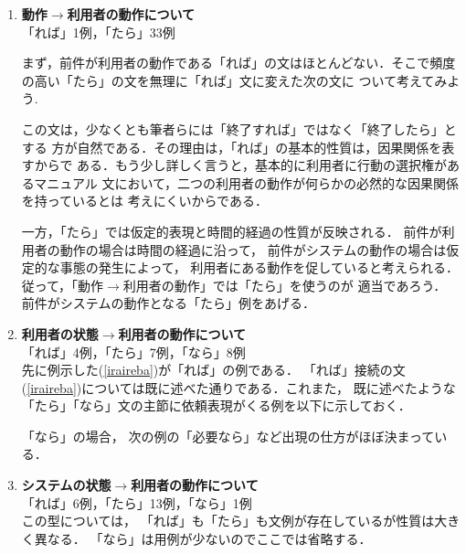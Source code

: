 \begin{enumerate}
\item {\bf 動作$\rightarrow$利用者の動作について}\label{act-usract} \\
「れば」1例，「たら」33例

まず，前件が利用者の動作である「れば」の文はほとんどない．そこで頻度の高い「たら」の文を無理に「れば」文に変えた次の文に
ついて考えてみよう.

この文は，少なくとも筆者らには「終了すれば」ではなく「終了したら」とする
方が自然である．その理由は，「れば」の基本的性質は，因果関係を表すからで
ある．もう少し詳しく言うと，基本的に利用者に行動の選択権があるマニュアル
文において，二つの利用者の動作が何らかの必然的な因果関係を持っているとは
考えにくいからである．

一方，「たら」では仮定的表現と時間的経過の性質が反映される．
前件が利用者の動作の場合は時間の経過に沿って，
前件がシステムの動作の場合は仮定的な事態の発生によって，
利用者にある動作を促していると考えられる．
従って，「動作$\rightarrow$利用者の動作」では「たら」を使うのが
適当であろう．
前件がシステムの動作となる「たら」例をあげる．

\item {\bf 利用者の状態$\rightarrow$利用者の動作について}\label{st-usract}\\
「れば」4例，「たら」7例，「なら」8例\\
先に例示した(\ref{iraireba})が「れば」の例である．
「れば」接続の文(\ref{iraireba})については既に述べた通りである．これまた，
既に述べたような「たら」「なら」文の主節に依頼表現がくる例を以下に示しておく．

「なら」の場合，
次の例の「必要なら」など出現の仕方がほぼ決まっている．

\item {\bf システムの状態$\rightarrow$利用者の動作について}\label{sysst-usract}\\
「れば」6例，「たら」13例，「なら」1例\\
この型については，
「れば」も「たら」も文例が存在しているが性質は大きく異なる．
「なら」は用例が少ないのでここでは省略する．


\end{enumerate}
